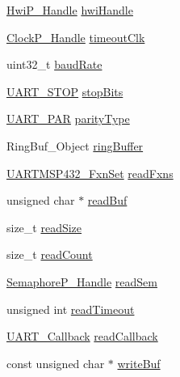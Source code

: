 \begin{DoxyCompactItemize}
\begin{tabbing}
\end{tabbing}\item 
\hyperlink{_hwi_p_8h_a7dd325ff62af296374efc6d317f5e368}{Hwi\+P\+\_\+\+Handle} \hyperlink{struct_u_a_r_t_m_s_p432___object_ad2a535f44ab58704130b1381c0c3d03c}{hwi\+Handle}
\item 
\hyperlink{_clock_p_8h_a003dd74e948999fe5c3f45d8f51501f1}{Clock\+P\+\_\+\+Handle} \hyperlink{struct_u_a_r_t_m_s_p432___object_ae48d206e09cdff169c9076a1ef02ad24}{timeout\+Clk}
\item 
uint32\+\_\+t \hyperlink{struct_u_a_r_t_m_s_p432___object_a3d0c8b50ade46baa9363911c07aff967}{baud\+Rate}
\item 
\hyperlink{_u_a_r_t_8h_a176b71ca19bc13d7534fa30fc18c2243}{U\+A\+R\+T\+\_\+\+S\+T\+O\+P} \hyperlink{struct_u_a_r_t_m_s_p432___object_a8af08764df3f4b82b5ef3c7e69a00ff9}{stop\+Bits}
\item 
\hyperlink{_u_a_r_t_8h_ac70b5aa75500b8c45a51ec560deccfc4}{U\+A\+R\+T\+\_\+\+P\+A\+R} \hyperlink{struct_u_a_r_t_m_s_p432___object_ab68a9aa8287dd5572f3747753ac3ab96}{parity\+Type}
\item 
Ring\+Buf\+\_\+\+Object \hyperlink{struct_u_a_r_t_m_s_p432___object_a77d3d4221017d17f2e9b0fbfa0ed189e}{ring\+Buffer}
\item 
\hyperlink{struct_u_a_r_t_m_s_p432___fxn_set}{U\+A\+R\+T\+M\+S\+P432\+\_\+\+Fxn\+Set} \hyperlink{struct_u_a_r_t_m_s_p432___object_ae8deeef4aac74548eeda1138cfabf05b}{read\+Fxns}
\item 
unsigned char $\ast$ \hyperlink{struct_u_a_r_t_m_s_p432___object_a9d7107efa956c346858d1dd861dcc04d}{read\+Buf}
\item 
size\+\_\+t \hyperlink{struct_u_a_r_t_m_s_p432___object_aa7d1839d5de570399710a649de16586f}{read\+Size}
\item 
size\+\_\+t \hyperlink{struct_u_a_r_t_m_s_p432___object_ad42f4f5e328e80f2c0a75611e2fc0fd6}{read\+Count}
\item 
\hyperlink{_semaphore_p_8h_a7f34865f33e666455692544e5f12d1f2}{Semaphore\+P\+\_\+\+Handle} \hyperlink{struct_u_a_r_t_m_s_p432___object_a45d7c2038e1f86cbdddea662096f7f48}{read\+Sem}
\item 
unsigned int \hyperlink{struct_u_a_r_t_m_s_p432___object_ad92f9a9041f1008681697050f6051b25}{read\+Timeout}
\item 
\hyperlink{_u_a_r_t_8h_a44620a9d91e0357ebc6f0a79984d9e1e}{U\+A\+R\+T\+\_\+\+Callback} \hyperlink{struct_u_a_r_t_m_s_p432___object_a8fda5db49be18246cda20b13eb36b12c}{read\+Callback}
\item 
const unsigned char $\ast$ \hyperlink{struct_u_a_r_t_m_s_p432___object_a7fdcff6e1f850d675060ee201bcda7cd}{write\+Buf}

\end{DoxyCompactItemize}
